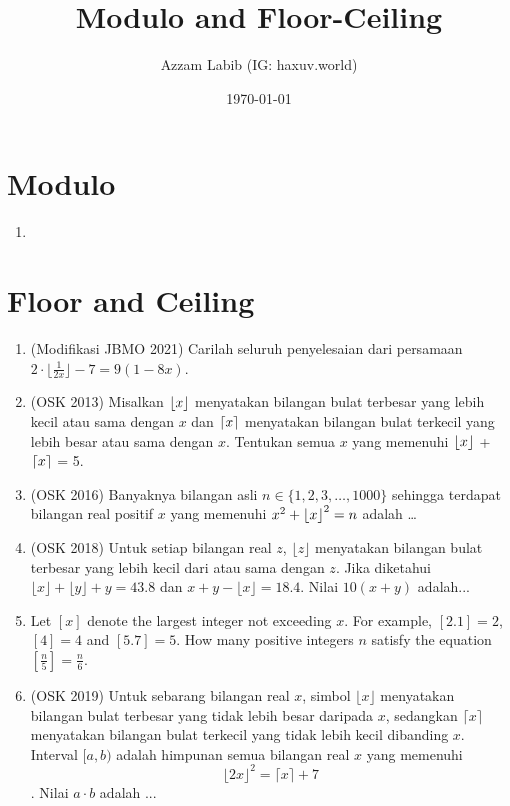 \documentclass[11pt]{scrartcl}
\title{Modulo and Floor-Ceiling}
\author{Azzam Labib (IG: haxuv.world)}
\date{\today}
\begin{document}
\maketitle
\section{Modulo}
\begin{enumerate}
    \item 
\end{enumerate}
\section{Floor and Ceiling}
\begin{enumerate}
    \item (Modifikasi JBMO 2021) Carilah seluruh penyelesaian dari persamaan $2\cdot \lfloor{\frac{1}{2x}}\rfloor - 7 = 9(1 - 8x)$.

    \item (OSK 2013) Misalkan $\left\lfloor x \right\rfloor$ menyatakan bilangan bulat terbesar yang lebih kecil atau sama dengan $x$ dan $\left\lceil x \right\rceil$ menyatakan bilangan bulat terkecil yang lebih besar atau sama dengan $x$. Tentukan semua $x$ yang memenuhi $\left\lfloor x \right\rfloor$ + $\left\lceil x \right\rceil$ = 5.
    
    \item (OSK 2016) Banyaknya bilangan asli $n \in \{1,2,3,\dots,1000\}$ sehingga terdapat bilangan real positif $x$ yang memenuhi $x^2+\left\lfloor x \right\rfloor^2=n$ adalah \dots
    
    \item (OSK 2018) Untuk setiap bilangan real $z$, $\lfloor z \rfloor$ menyatakan bilangan bulat terbesar yang lebih kecil dari atau sama dengan $z$. Jika diketahui $\lfloor x \rfloor + \lfloor y \rfloor + y = 43.8$ dan $x + y - \lfloor x \rfloor = 18.4$. Nilai $10(x + y)$ adalah...
    
    \item Let $[x]$ denote the largest integer not exceeding $x$. For example, $[2.1]=2$, $[4]=4$ and $[5.7]=5$. How many positive integers $n$ satisfy the equation $\left[\frac{n}{5}\right]=\frac{n}{6}$.

    \item (OSK 2019) Untuk sebarang bilangan real $x$, simbol $\lfloor x \rfloor$ menyatakan bilangan bulat terbesar yang tidak lebih besar daripada $x$, sedangkan $\lceil x \rceil$ menyatakan bilangan bulat terkecil yang tidak lebih kecil dibanding $x$. Interval $[a, b)$ adalah himpunan semua bilangan real $x$ yang memenuhi
    $$\lfloor 2x \rfloor^2 = \lceil x \rceil + 7$$.
    Nilai $a \cdot b$ adalah ...


\end{enumerate}
\end{document}
